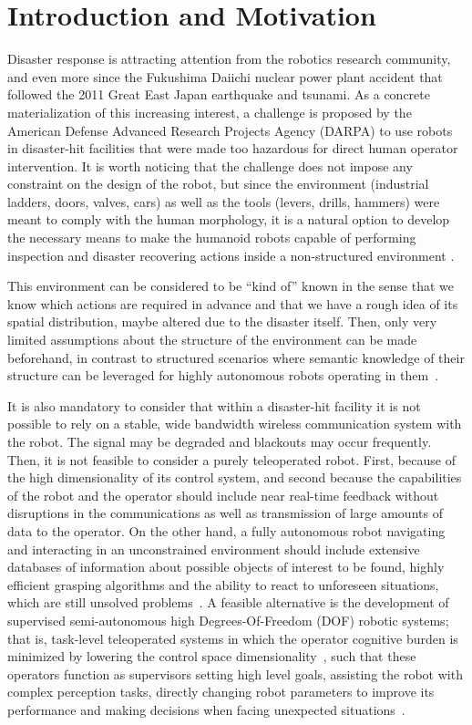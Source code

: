 \section{Introduction and Motivation}
	\label{sec:introduction}

	Disaster response is attracting attention from the robotics research community, and even more since the
	Fukushima Daiichi nuclear power plant accident that followed the 2011 Great East Japan earthquake and tsunami.
	As a concrete materialization of this increasing interest, a challenge is proposed by the American Defense
	Advanced Research Projects Agency (DARPA) to use robots in disaster-hit facilities that were made too hazardous
	for direct human operator intervention.
	It is worth noticing that the challenge does not impose any constraint on the design of the robot, but since the
	environment (industrial ladders, doors, valves, cars) as well as the tools (levers, drills, hammers) were meant
	to comply with the human morphology, it is a natural option to develop the necessary means to make the humanoid
	robots capable of performing inspection and disaster recovering actions inside a non-structured environment
	\cite{Bouyarmane}.
	
	This environment can be considered to be ``kind of'' known in the sense that we know which actions
	are required in advance and that we have a rough idea of its spatial distribution,
	maybe altered due to the disaster itself.
	Then, only very limited assumptions about the structure of the environment can be made beforehand,
	in contrast to structured scenarios where semantic knowledge of their structure can be leveraged
	for highly autonomous robots operating in them~\cite{Kohlbrecher}.
	
	It is also mandatory to consider that within a disaster-hit facility it is not possible to rely on a stable,
	wide bandwidth wireless communication system with the robot.
	The signal may be degraded and blackouts may occur frequently.
	Then, it is not feasible to consider a purely teleoperated robot.
	First, because of the high dimensionality of its control system, and second because the capabilities of
	the robot and the operator should include near real-time feedback without disruptions in the communications
	as well as transmission of large amounts of data to the operator.
	On the other hand, a fully autonomous robot navigating and interacting in an unconstrained environment
	should include extensive databases of information about possible objects of interest to be found,
	highly efficient grasping algorithms and the ability to react to unforeseen situations,
	which are still unsolved problems~\cite{Romay}.
	A feasible alternative is the development of supervised semi-autonomous high Degrees-Of-Freedom (DOF)
	robotic systems; that is, task-level teleoperated systems in which the operator cognitive burden is
	minimized by lowering the control space dimensionality~\cite{Katyal}, such that these operators function
	as supervisors setting high level goals, assisting the robot with complex perception tasks, directly
	changing robot parameters to improve its performance and making decisions when facing unexpected
	situations~\cite{Kohlbrecher}.